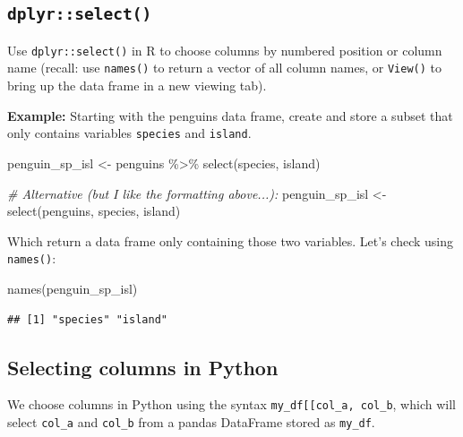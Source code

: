 \documentclass[
]{book}
\newenvironment{Shaded}{\begin{snugshade}}{\end{snugshade}}
\newcommand{\CommentTok}[1]{\textcolor[rgb]{0.56,0.35,0.01}{\textit{#1}}}
\newcommand{\FunctionTok}[1]{\textcolor[rgb]{0.00,0.00,0.00}{#1}}
\newcommand{\NormalTok}[1]{#1}
\newcommand{\OtherTok}[1]{\textcolor[rgb]{0.56,0.35,0.01}{#1}}
\newcommand{\SpecialCharTok}[1]{\textcolor[rgb]{0.00,0.00,0.00}{#1}}
\begin{document}
\hypertarget{dplyrselect}{%
\subsection{\texorpdfstring{\texttt{dplyr::select()}}{dplyr::select()}}\label{dplyrselect}}

Use \texttt{dplyr::select()} in R to choose columns by numbered position or column name (recall: use \texttt{names()} to return a vector of all column names, or \texttt{View()} to bring up the data frame in a new viewing tab).

\textbf{Example:} Starting with the penguins data frame, create and store a subset that only contains variables \texttt{species} and \texttt{island}.

\begin{Shaded}
\begin{Highlighting}[]
\NormalTok{penguin\_sp\_isl }\OtherTok{\textless{}{-}}\NormalTok{ penguins }\SpecialCharTok{\%\textgreater{}\%} 
  \FunctionTok{select}\NormalTok{(species, island)}

\CommentTok{\# Alternative (but I like the formatting above...): }
\NormalTok{penguin\_sp\_isl }\OtherTok{\textless{}{-}} \FunctionTok{select}\NormalTok{(penguins, species, island)}
\end{Highlighting}
\end{Shaded}

Which return a data frame only containing those two variables. Let's check using \texttt{names()}:

\begin{Shaded}
\begin{Highlighting}[]
\FunctionTok{names}\NormalTok{(penguin\_sp\_isl)}
\end{Highlighting}
\end{Shaded}

\begin{verbatim}
## [1] "species" "island"
\end{verbatim}

\hypertarget{selecting-columns-in-python}{%
\subsection{Selecting columns in Python}\label{selecting-columns-in-python}}

We choose columns in Python using the syntax \texttt{my\_df{[}{[}\textquotesingle{}col\_a\textquotesingle{},\ \textquotesingle{}col\_b\textquotesingle{}{]}{]}}, which will select \texttt{col\_a} and \texttt{col\_b} from a pandas DataFrame stored as \texttt{my\_df}.
\end{document}
